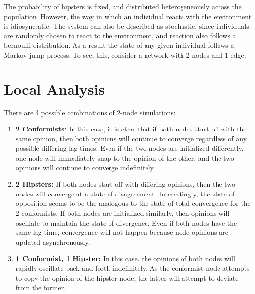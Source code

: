 \documentclass{article}
\begin{document}
The probability of hipsters is fixed, and distributed heterogeneously across the population. However, the way in which an individual reacts with the environment is idiosyncratic. The system can also be described as stochastic, since individuals are randomly chosen to react to the environment, and reaction also follows a bernoulli distribution. As a result the state of any given individual follows a Markov jump process. To see, this, consider a network with 2 nodes and 1 edge.

\section*{Local Analysis}
There are 3 possible combinations of 2-node simulations:
\begin{enumerate}
\item \textbf{2 Conformists:} In this case, it is clear that if both nodes start off with the same opinion, then both opinions will continue to converge regardless of any possible differing lag times. Even if the two nodes are initialized differently, one node will immediately snap to the opinion of the other, and the two opinions will continue to converge indefinitely. 
\item \textbf{2 Hipsters:} If both nodes start off with differing opinions, then the two nodes will converge at a state of disagreement. Interestingly, the state of opposition seems to be the analogous to the state of total convergence for the 2 conformists. If both nodes are initialized similarly, then opinions will oscillate to maintain the state of divergence. Even if both nodes have the same lag time, convergence will not happen because node opinions are updated asynchronously. 
\item \textbf{1 Conformist, 1 Hipster:} In this case, the opinions of both nodes will rapidly oscillate back and forth indefinitely. As the conformist node attempts to copy the opinion of the hipster node, the latter will attempt to deviate from the former.   
\end{enumerate}
\end{document}
